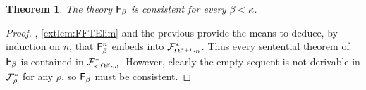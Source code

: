 \documentclass[UKenglish,cleveref,DIV=12]{scrartcl}
\let\forall\forallAlt
\newtheorem{theorem}{Theorem}
\theoremstyle{definition}
\theoremstyle{definition}
\begin{document}
\begin{theorem}\label{extthm:FFconsis}
 The theory $\mathsf{F}_\beta$ is consistent for every $\beta<\kappa$.
\end{theorem}
\begin{proof}
, \cref{extlem:FFTElim} and the previous  provide the means to deduce, by induction on $n$, that $\mathsf{F}^n_\beta$ embeds into $\mathcal{F}^*_{\Omega^{\beta+1}\cdot n}$. Thus every sentential theorem of $\mathsf{F}_\beta$ is contained in $\mathcal{F}^*_{<\Omega^\beta\cdot\omega}$. However, clearly the empty sequent is not derivable in $\mathcal{F}^*_\rho$ for any $\rho$, so $\mathsf{F}_\beta$ must be consistent.
\end{proof}
%
\end{document}
